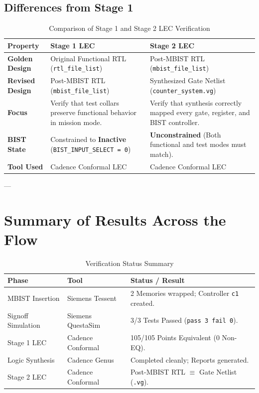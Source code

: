 \documentclass[12pt]{article}
\begin{document}
\subsection{Differences from Stage 1}
\begin{table}[H]
\centering
\begin{tabular}{|l|p{6.5cm}|p{6.5cm}|}
\hline
\textbf{Property} & \textbf{Stage 1 LEC} & \textbf{Stage 2 LEC} \\
\hline
\textbf{Golden Design} & Original Functional RTL (\texttt{rtl\_file\_list}) & Post-MBIST RTL (\texttt{mbist\_file\_list}) \\
\hline
\textbf{Revised Design} & Post-MBIST RTL (\texttt{mbist\_file\_list}) & Synthesized Gate Netlist (\texttt{counter\_system.vg}) \\
\hline
\textbf{Focus} & Verify that test collars preserve functional behavior in mission mode. & Verify that synthesis correctly mapped every gate, register, and BIST controller. \\
\hline
\textbf{BIST State} & Constrained to \textbf{Inactive} (\texttt{BIST\_INPUT\_SELECT = 0}) & \textbf{Unconstrained} (Both functional and test modes must match). \\
\hline
\textbf{Tool Used} & Cadence Conformal LEC & Cadence Conformal LEC \\
\hline
\end{tabular}
\caption{Comparison of Stage 1 and Stage 2 LEC Verification}
\end{table}

---

\section{Summary of Results Across the Flow}

\begin{table}[H]
\centering
\begin{tabular}{|l|l|l|}
\hline
\textbf{Phase} & \textbf{Tool} & \textbf{Status / Result} \\
\hline
MBIST Insertion & Siemens Tessent & 2 Memories wrapped; Controller \texttt{c1} created. \\
Signoff Simulation & Siemens QuestaSim & 3/3 Tests Passed (\texttt{pass 3 fail 0}). \\
Stage 1 LEC & Cadence Conformal & 105/105 Points Equivalent (0 Non-EQ). \\
Logic Synthesis & Cadence Genus & Completed cleanly; Reports generated. \\
Stage 2 LEC & Cadence Conformal & Post-MBIST RTL $\equiv$ Gate Netlist (\texttt{.vg}). \\
\hline
\end{tabular}
\caption{Verification Status Summary}
\end{table}
\end{document}
